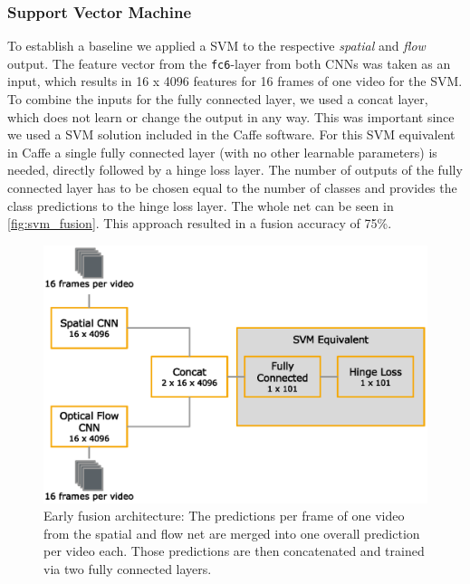 \subsubsection{Support Vector Machine}
To establish a baseline we applied a SVM to the respective \emph{spatial} and \emph{flow} output.
The feature vector from the \texttt{fc6}-layer from both CNNs was taken as an input, which results in 16 x 4096 features for 16 frames of one video for the SVM.
To combine the inputs for the fully connected layer, we used a concat layer, which does not learn or change the output in any way.
This was important since we used a SVM solution included in the Caffe software.
For this SVM equivalent in Caffe a single fully connected layer (with no other learnable parameters) is needed, directly followed by a hinge loss layer.
The number of outputs of the fully connected layer has to be chosen equal to the number of classes and provides the class predictions to the hinge loss layer.
The whole net can be seen in \autoref{fig:svm_fusion}.
This approach resulted in a fusion accuracy of 75\%.

\begin{figure}[tb]
	\centering
	\includegraphics[scale=.7]{images/fusion_svm.eps}
	\caption{Early fusion architecture: The predictions per frame of one video from the spatial and flow net are merged into one overall prediction per video each. Those predictions are then concatenated and trained via two fully connected layers.}
	\label{fig:svm_fusion}
\end{figure}

